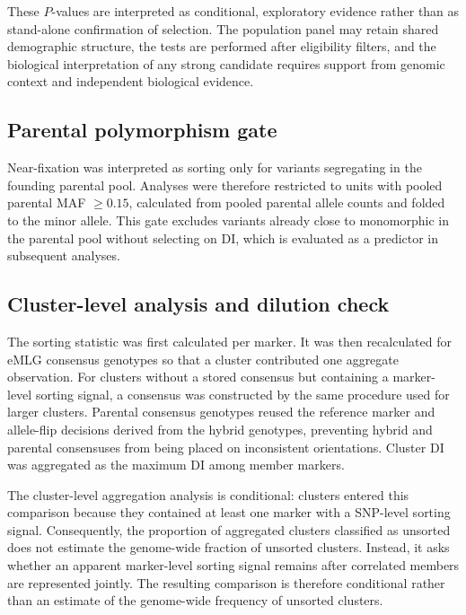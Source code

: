 \documentclass[11pt]{article}
\begin{document}
These \(P\)-values are interpreted as conditional, exploratory evidence rather
than as stand-alone confirmation of selection. The population panel may retain
shared demographic structure, the tests are performed after eligibility
filters, and the biological interpretation of any strong candidate requires
support from genomic context and independent biological evidence.

\subsection{Parental polymorphism gate}

Near-fixation was interpreted as sorting only for variants segregating in the
founding parental pool. Analyses were therefore restricted to units with pooled
parental MAF \(\geq0.15\), calculated from pooled parental allele counts and
folded to the minor allele. This gate excludes variants already close to
monomorphic in the parental pool without selecting on DI, which is evaluated as
a predictor in subsequent analyses.

\subsection{Cluster-level analysis and dilution check}

The sorting statistic was first calculated per marker. It was then recalculated
for eMLG consensus genotypes so that a cluster contributed one aggregate
observation. For clusters without a stored consensus but containing a
marker-level sorting signal, a consensus was constructed by the same procedure
used for larger clusters. Parental consensus genotypes reused the reference
marker and allele-flip decisions derived from the hybrid genotypes, preventing
hybrid and parental consensuses from being placed on inconsistent orientations.
Cluster DI was aggregated as the maximum DI among member markers.

The cluster-level aggregation analysis is conditional: clusters entered this
comparison because they contained at least one marker with a SNP-level sorting
signal. Consequently, the proportion of aggregated clusters classified as
unsorted does not estimate the genome-wide fraction of unsorted clusters.
Instead, it asks whether an apparent marker-level sorting signal remains after
correlated members are represented jointly. The resulting comparison is
therefore conditional rather than an estimate of the genome-wide frequency of
unsorted clusters.
\end{document}
